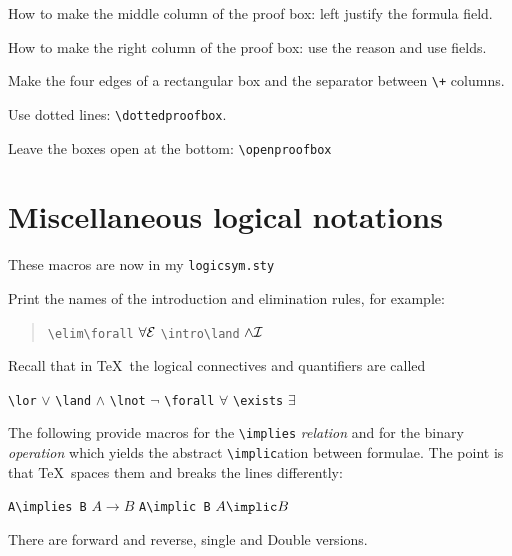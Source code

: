 \documentclass{article}
\def\intro#1{{#1}{\cal I}}
\def\elim#1{{#1}{\cal E}}
\def\elim#1{{{#1}{\cal E}}}
\def\intro#1{{{#1}{\cal I}}}
\let\implies\to
\begin{document}
 How to make the middle column of the proof box:
 left justify the formula field.

 How to make the right column of the proof box:
 use the reason and use fields.


 Make the four edges of a rectangular box and the separator
 between \verb/\+/ columns.


 Use dotted lines: \verb/\dottedproofbox/.

 Leave the boxes open at the bottom: \verb/\openproofbox/

\section{Miscellaneous logical notations}

These macros are now in my \texttt{logicsym.sty}

 Print the names of the introduction and elimination rules, for example:
  \begin{quote}
     \verb/\elim\forall/ $\elim\forall$ \qquad
     \verb/\intro\land/ $\intro\land$ \qquad
  \end{quote}
 Recall that in \TeX\ the logical connectives and quantifiers are called
  \begin{center}
    \verb/\lor/ $\lor$\quad
    \verb/\land/ $\land$\quad
    \verb/\lnot/ $\lnot$\quad
    \verb/\forall/ $\forall$\quad
    \verb/\exists/ $\exists$
  \end{center}
 The following provide macros for the \verb/\implies/ {\em relation\/}
 and for the binary {\em operation\/} which yields the abstract
 \verb/\implic/ation between formulae.
 The point is that \TeX\ spaces them and breaks the lines differently:
  \begin{center}
    \verb/A\implies B/ $A\implies B$\quad
    \verb/A\implic B/ $A\implic B$
  \end{center}
 There are forward and reverse, single and Double versions.
\end{document}
